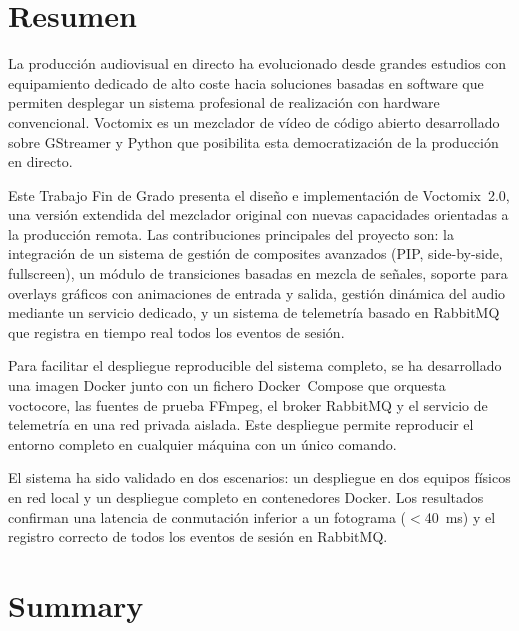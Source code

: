 \newpage
\thispagestyle{fancy}

\chapter*{Resumen}

La producción audiovisual en directo ha evolucionado desde grandes estudios con
equipamiento dedicado de alto coste hacia soluciones basadas en software que permiten
desplegar un sistema profesional de realización con hardware convencional. Voctomix es
un mezclador de vídeo de código abierto desarrollado sobre GStreamer y Python que
posibilita esta democratización de la producción en directo.

Este Trabajo Fin de Grado presenta el diseño e implementación de Voctomix~2.0, una
versión extendida del mezclador original con nuevas capacidades orientadas a la
producción remota. Las contribuciones principales del proyecto son: la integración de
un sistema de gestión de composites avanzados (PIP, side-by-side, fullscreen), un módulo
de transiciones basadas en mezcla de señales, soporte para overlays gráficos con
animaciones de entrada y salida, gestión dinámica del audio mediante un servicio
dedicado, y un sistema de telemetría basado en RabbitMQ que registra en tiempo real
todos los eventos de sesión.

Para facilitar el despliegue reproducible del sistema completo, se ha desarrollado una
imagen Docker junto con un fichero Docker~Compose que orquesta voctocore, las fuentes
de prueba FFmpeg, el broker RabbitMQ y el servicio de telemetría en una red privada
aislada. Este despliegue permite reproducir el entorno completo en cualquier máquina
con un único comando.

El sistema ha sido validado en dos escenarios: un despliegue en dos equipos físicos
en red local y un despliegue completo en contenedores Docker. Los resultados confirman
una latencia de conmutación inferior a un fotograma ($<$40~ms) y el registro correcto
de todos los eventos de sesión en RabbitMQ.

\newpage
\thispagestyle{fancy}

\chapter*{Summary}

